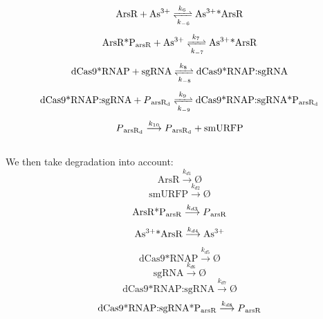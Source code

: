 \begin{equation}
\text{ArsR} +\text{As\textsuperscript{3+}}\xrightleftharpoons[k_{-6}]{k_6}\text{As\textsuperscript{3+}*ArsR}
\end{equation}
\begin{equation}
\text{ArsR*P\textsubscript{arsR}} +\text{As\textsuperscript{3+}}\xrightleftharpoons[k_{-7}]{k_7}\text{As\textsuperscript{3+}*ArsR}
\end{equation}
\begin{equation}
\text{dCas9*RNAP}+\text{sgRNA}\xrightleftharpoons[k_{-8}]{k_8} \text{dCas9*RNAP:sgRNA}
\end{equation}
\begin{equation}
\text{dCas9*RNAP:sgRNA}+P\textsubscript{arsR\textsubscript{d}}\xrightleftharpoons[k_{-9}]{k_9}\text{dCas9*RNAP:sgRNA*P\textsubscript{arsR\textsubscript{d}}}
\end{equation}
\begin{equation}
P\textsubscript{arsR\textsubscript{d}}\stackrel{k_{10}}{\longrightarrow} P\textsubscript{arsR\textsubscript{d}}+\text{smURFP}
\end{equation}
\\
We then take degradation into account:\\
\begin{equation}
\text{ArsR}\stackrel{k_{d1}}{\longrightarrow}Ø
\end{equation}
\begin{equation}
\text{smURFP}\stackrel{k_{d2}}{\longrightarrow}Ø
\end{equation}
\begin{equation}
\text{ArsR*P\textsubscript{arsR}}\stackrel{k_{d3}}{\longrightarrow} P\textsubscript{arsR}
\end{equation}
\begin{equation}
\text{As\textsuperscript{3+}*ArsR} \stackrel{k_{d4}}{\longrightarrow}\text{As\textsuperscript{3+}}
\end{equation}
\begin{equation}
\text{dCas9*RNAP}\stackrel{k_{d5}}{\longrightarrow}Ø
\end{equation}
\begin{equation}
\text{sgRNA}\stackrel{k_{d6}}{\longrightarrow}Ø
\end{equation}
\begin{equation}
\text{dCas9*RNAP:sgRNA}\stackrel{k_{d7}}{\longrightarrow}Ø
\end{equation}
\begin{equation}
\text{dCas9*RNAP:sgRNA*P\textsubscript{arsR}}\stackrel{k_{d8}}{\longrightarrow}P\textsubscript{arsR}
\end{equation}
\\

